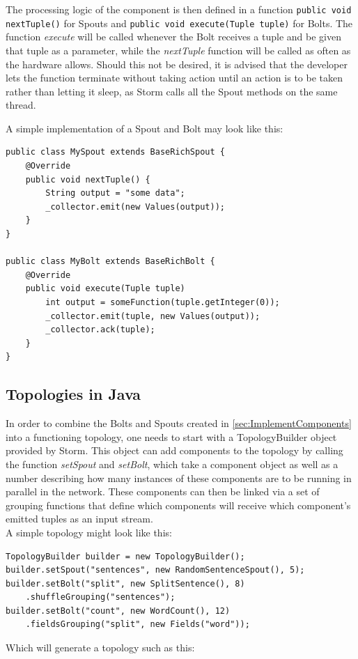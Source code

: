 \documentclass[12pt,a4paper]{article}
\begin{document}
The processing logic of the component is then defined in a function \lstinline$public void nextTuple()$ for Spouts and \lstinline$public void execute(Tuple tuple)$ for Bolts. The function \textit{execute} will be called whenever the Bolt receives a tuple and be given that tuple as a parameter, while the \textit{nextTuple} function will be called as often as the hardware allows. Should this not be desired, it is advised that the developer lets the function terminate without taking action until an action is to be taken rather than letting it sleep, as Storm calls all the Spout methods on the same thread.

A simple implementation of a Spout and Bolt may look like this:\\
\begin{lstlisting}
public class MySpout extends BaseRichSpout {
    @Override
    public void nextTuple() {
        String output = "some data";
        _collector.emit(new Values(output));
    }
}

public class MyBolt extends BaseRichBolt {
    @Override
    public void execute(Tuple tuple)
        int output = someFunction(tuple.getInteger(0));
        _collector.emit(tuple, new Values(output));
        _collector.ack(tuple);
    }
}
\end{lstlisting}
\subsection{Topologies in Java}
\label{sec:ImplementTopology}
In order to combine the Bolts and Spouts created in \ref{sec:ImplementComponents} into a functioning topology, one needs to start with a TopologyBuilder object provided by Storm. This object can add components to the topology by calling the function \textit{setSpout} and \textit{setBolt}, which take a component object as well as a number describing how many instances of these components are to be running in parallel in the network. These components can then be linked via a set of grouping functions that define which components will receive which component's emitted tuples as an input stream.\\

A simple topology might look like this:
\begin{lstlisting}
TopologyBuilder builder = new TopologyBuilder();
builder.setSpout("sentences", new RandomSentenceSpout(), 5);
builder.setBolt("split", new SplitSentence(), 8)
    .shuffleGrouping("sentences");
builder.setBolt("count", new WordCount(), 12)
    .fieldsGrouping("split", new Fields("word"));
\end{lstlisting}
Which will generate a topology such as this:\\
\end{document}
